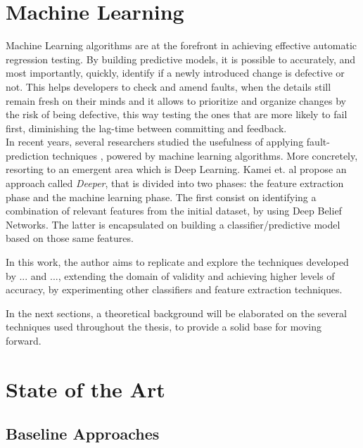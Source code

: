 
\section{Machine Learning}

Machine Learning algorithms are at the forefront in achieving effective automatic regression testing. By building predictive models, it is possible to accurately, and most importantly, quickly, identify if a newly introduced change is defective or not. This helps developers to check and amend faults, when the details still remain fresh on their minds and it allows to prioritize and organize changes by the risk of being defective, this way testing the ones that are more likely to fail first, diminishing the lag-time between committing and feedback.
\\

In recent years, several researchers studied the usefulness of applying fault-prediction techniques , powered by machine learning algorithms.
More concretely, resorting to an emergent area which is Deep Learning. Kamei et. al propose an approach called \textit{Deeper}, that is divided into two phases: the feature extraction phase and the machine learning phase. The first consist on identifying a combination of relevant features from the initial dataset, by using Deep Belief Networks. The latter is encapsulated on building a classifier/predictive model based on those same features.

In this work, the author aims to replicate and explore the techniques developed by ... and ..., extending the domain of validity and achieving higher levels of accuracy, by experimenting other classifiers and feature extraction techniques.

In the next sections, a theoretical background will be elaborated on the several techniques used throughout the thesis, to provide a solid base for moving forward.


\section{State of the Art}
\label{section:stateoftheart}

\subsection{Baseline Approaches}

